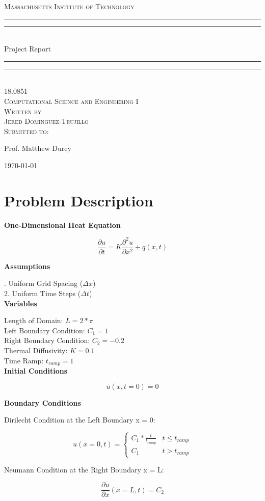 \documentclass[10pt, letter, showtrims]{extarticle}
\newcommand{\University}{Massachusetts Institute of Technology}
\newcommand{\ClassCode}{18.0851}
\newcommand{\ClassTitle}{Computational Science and Engineering I}
\newcommand{\Title}{Project Report}
\newcommand{\FirstName}{Jered}
\newcommand{\LastName}{Dominguez-Trujillo}
\newcommand{\ProfTitle}{Prof.}
\newcommand{\ProfFirst}{Matthew}
\newcommand{\ProfLast}{Durey}
\newcommand*{\titleGP}{\begingroup %
\centering %

\textsc{\LARGE \University{}} \\[2\baselineskip] %

\rule{\textwidth}{1.6pt}\vspace*{-\baselineskip}\vspace*{2pt} %
\rule{\textwidth}{0.4pt}\\[\baselineskip] %

{\LARGE \Title{}}\\[0.2\baselineskip] %

\rule{\textwidth}{0.4pt}\vspace*{-\baselineskip}\vspace{3.2pt} %
\rule{\textwidth}{1.6pt}\\[\baselineskip] %

\scshape %
{\large \ClassCode{}} \\[0.5\baselineskip]
{\large \ClassTitle{}} \\[4\baselineskip]


Written by \\[0.5\baselineskip]
{\Large \FirstName{} \LastName{}}\\[2\baselineskip] %
Submitted to: \\[0.5\baselineskip]
{\Large \ProfTitle{} \ProfFirst{} \ProfLast{}\par} %
\vspace*{16\baselineskip}
{\large \today}\par 
\vfill %

\endgroup}
\begin{document}
 
	\begin{titlepage}
		\titleGP{}
	\end{titlepage}

	\section{Problem Description}

		\noindent
		\textbf{One-Dimensional Heat Equation}
		
		\begin{equation}
			\frac{\partial u}{\partial t} = K \frac{\partial^{2} u}{\partial x^{2}} + q(x, t)
		\end{equation}

		\noindent
		\textbf{Assumptions}
	
		. Uniform Grid Spacing ($\Delta x$) \\
		2. Uniform Time Steps   ($\Delta t$) \\	

		\noindent
		\textbf{Variables}
		
		\noindent
		Length of Domain: $L = 2*\pi$	\\
		Left Boundary Condition: $C_{1} = 1$ \\
		Right Boundary Condition: $C_{2} = -0.2$ \\
		Thermal Diffusivity: $K = 0.1$ \\
		Time Ramp: $t_{ramp} = 1$ \\

		\noindent
		\textbf{Initial Conditions}
		
		\begin{equation}
			u(x, t = 0) = 0
		\end{equation}	
	
		\noindent
		\textbf{Boundary Conditions}

		\noindent
		Dirilecht Condition at the Left Boundary x = 0:
	
		\begin{equation}
			u(x=0, t) = \begin{cases} 
          					C_{1} * \frac{t}{t_{ramp}} & t\leq t_{ramp} \\
          					C_{1}                      & t > t_{ramp}
       					\end{cases}
    		\end{equation}
    
    		\noindent
    		Neumann Condition at the Right Boundary x = L:
    
    		\begin{equation}
			\frac{\partial u}{\partial x}(x=L, t) = C_{2}
    		\end{equation}		
\end{document}
